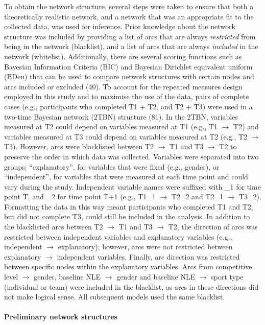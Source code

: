 \documentclass[
  english,
  man]{apa6}
\let\oldparagraph\paragraph
\renewcommand{\paragraph}[1]{\oldparagraph{#1}\mbox{}}
\begin{document}
To obtain the network structure, several steps were taken to ensure that both a theoretically realistic network, and a network that was an appropriate fit to the collected data, was used for inference.
Prior knowledge about the network structure was included by providing a list of arcs that are always \emph{restricted} from being in the network (blacklist), and a list of arcs that are always \emph{included} in the network (whitelist).
Additionally, there are several scoring functions such as Bayesian Information Criteria (BIC) and Bayesian Dirichlet equivalent uniform (BDeu) that can be used to compare network structures with certain nodes and arcs included or excluded (40).
To account for the repeated measures design employed in this study and to maximise the use of the data, pairs of complete cases (e.g., participants who completed T1 + T2, and T2 + T3) were used in a two-time Bayesian network (2TBN) structure (81).
In the 2TBN, variables measured at T2 could depend on variables measured at T1 (e.g., T1 \(\rightarrow\) T2) and variables measured at T3 could depend on variables measured at T2 (e.g., T2 \(\rightarrow\) T3).
However, arcs were blacklisted between T2 \(\rightarrow\) T1 and T3 \(\rightarrow\) T2 to preserve the order in which data was collected.
Variables were separated into two groups; ``explanatory'', for variables that were fixed (e.g., gender), or ``independent'', for variables that were measured at each time point and could vary during the study.
Independent variable names were suffixed with \_1 for time point T, and \_2 for time point T+1 (e.g., T1\_1 \(\rightarrow\) T2\_2 and T2\_1 \(\rightarrow\) T3\_2).
Formatting the data in this way meant participants who completed T1 and T2, but did not complete T3, could still be included in the analysis.
In addition to the blacklisted arcs between T2 \(\rightarrow\) T1 and T3 \(\rightarrow\) T2, the direction of arcs was restricted between independent variables and explanatory variables (e.g., independent \(\rightarrow\) explanatory); however, arcs were not restricted between explanatory \(\rightarrow\) independent variables.
Finally, arc direction was restricted between specific nodes within the explanatory variables.
Arcs from competitive level \(\rightarrow\) gender, baseline NLE \(\rightarrow\) gender and baseline NLE \(\rightarrow\) sport type (individual or team) were included in the blacklist, as arcs in these directions did not make logical sense.
All subsequent models used the same blacklist.

\hypertarget{preliminary-network-structures}{%
\paragraph{Preliminary network structures}\label{preliminary-network-structures}}
\end{document}
